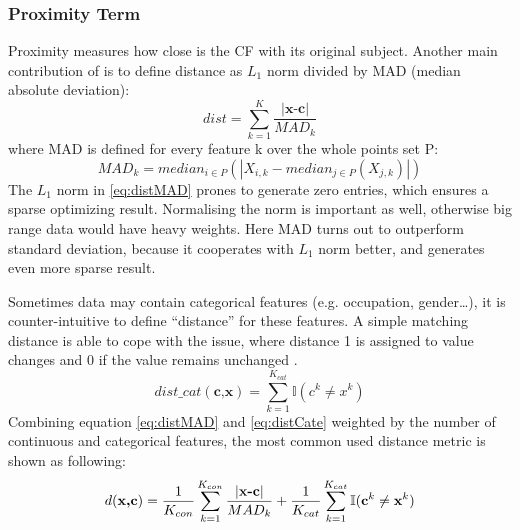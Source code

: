 \subsubsection{Proximity Term} Proximity measures how close is the CF with its original subject. Another main contribution of \cite{watcher2017} is to define distance as \emph{$L_1$} norm divided by MAD (median absolute deviation):
\begin{equation}\label{eq:distMAD}
  dist = \sum_{k=1}^{K}\frac{|\textbf{x-c}|}{MAD_k}
\end{equation}
where MAD is defined for every feature k over the whole points set P:
\begin{equation}\label{eq:MAD}
  MAD_k=median_{i\in P}(|{X_{i,k}}-median_{j\in P}(X_{j,k})|)
\end{equation}
The \emph{$L_1$} norm in \autoref{eq:distMAD} prones to generate zero entries, which ensures a sparse optimizing result. Normalising the norm is important as well, otherwise big range data would have heavy weights. Here MAD turns out to outperform standard deviation, because it cooperates with \emph{$L_1$} norm better, and generates even more sparse result.

Sometimes data may contain categorical features (e.g. occupation, gender\dots), it is counter-intuitive to define ``distance'' for these features. A simple matching distance is able to cope with the issue, where distance 1 is assigned to value changes and 0 if the value remains unchanged \cite{DiCE}.
\begin{equation}\label{eq:distCate}
  dist\_cat(\textbf{c,x})=\sum_{k=1}^{K_{cat}}\mathbb{I}(c^k\neq x^k)
\end{equation}
Combining equation \ref{eq:distMAD} and \ref{eq:distCate} weighted by the number of continuous and categorical features, the most common used distance metric is shown as following:
\begin{equation}\label{eq:distCombined}
  d(\textbf{x,c})=\frac{1}{K_{con}}\sum_{k=1}^{K_{con}}\frac{|\textbf{x-c}|}{MAD_k}
  +\frac{1}{K_{cat}}\sum_{k=1}^{K_{cat}}\mathbb{I}(\textbf c^k
  \neq \textbf x^k)
\end{equation}

